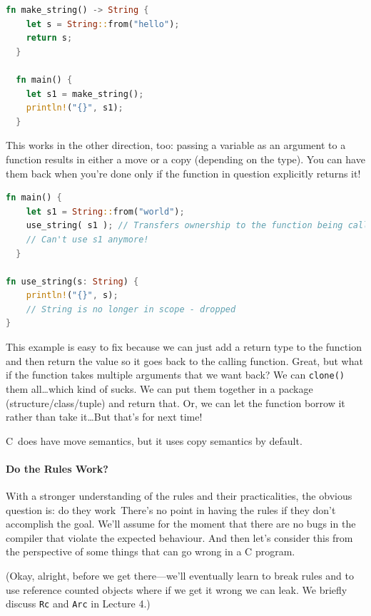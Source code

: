 \documentclass[a4paper]{report}
\newcommand{\CPP}{C\nolinebreak\hspace{-.05em}\raisebox{.4ex}{\tiny\bf +}\nolinebreak\hspace{-.10em}\raisebox{.4ex}{\tiny\bf +}}
\def\CPP{{C\nolinebreak[4]\hspace{-.05em}\raisebox{.4ex}{\tiny\bf ++}}}
\begin{document}
\begin{lstlisting}[language=Rust]
  fn make_string() -> String {
    let s = String::from("hello");
    return s;
  }

  fn main() {
    let s1 = make_string();
    println!("{}", s1);
  }
\end{lstlisting}

This works in the other direction, too: passing a variable as an argument to a function results in either a move or a copy (depending on the type). You can have them back when you're done only if the function in question explicitly returns it! 

\begin{lstlisting}[language=Rust]
  fn main() {
    let s1 = String::from("world");
	use_string( s1 ); // Transfers ownership to the function being called
	// Can't use s1 anymore!
  }
  
fn use_string(s: String) {
    println!("{}", s); 
    // String is no longer in scope - dropped
}
\end{lstlisting}

This example is easy to fix because we can just add a return type to the function and then return the value so it goes back to the calling function. Great, but what if the function takes multiple arguments that we want back? We can \texttt{clone()} them all\ldots which kind of sucks. We can put them together in a package (structure/class/tuple) and return that. Or, we can let the function borrow it rather than take it\ldots But that's for next time!

\CPP~does have move semantics, but it uses copy semantics by default.

\paragraph{Do the Rules Work?}
With a stronger understanding of the rules and their practicalities, the obvious question is: do they work\textinterrobang~There's no point in having the rules if they don't accomplish the goal. We'll assume for the moment that there are no bugs in the compiler that violate the expected behaviour. And then let's consider this from the perspective of some things that can go wrong in a C program.

(Okay, alright, before we get there---we'll eventually learn to break rules and to use reference counted objects where if we get it wrong we can leak. We briefly discuss \texttt{Rc} and \texttt{Arc} in Lecture 4.)
\end{document}
